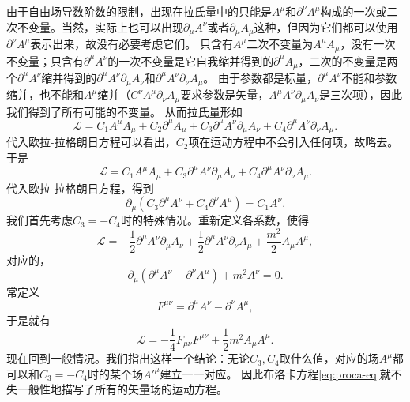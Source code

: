 由于自由场导数阶数的限制，出现在拉氏量中的只能是$A^\mu$和$\partial^\nu A^\mu$构成的一次或二次不变量。当然，实际上也可以出现$\partial_\mu A^\nu$或者$\partial_\mu A_\mu$这种，但因为它们都可以使用$\partial^\nu A^\mu$表示出来，故没有必要考虑它们。
只含有$A^\mu$二次不变量为$A^\mu A_\mu$，没有一次不变量；只含有$\partial^\mu A^\nu$的一次不变量是它自我缩并得到的$\partial^\mu A_\mu$，二次的不变量是两个$\partial^\mu A^\nu$缩并得到的$\partial^\mu A^\nu \partial_\mu A_\nu$和$\partial^\mu A^\nu \partial_\nu A_\mu$。
由于参数都是标量，$\partial^\mu A^\nu$不能和参数缩并，也不能和$A^\mu$缩并（$C^\nu A^\mu \partial_\nu A_\mu$要求参数是矢量，$A^\mu A^\nu \partial_\mu A_\nu$是三次项），因此我们得到了所有可能的不变量。
从而拉氏量形如
\[
    \mathcal{L} = C_1 A^\mu A_\mu + C_2 \partial^\mu A_\mu + C_3 \partial^\mu A^\nu \partial_\mu A_\nu + C_4 \partial^\mu A^\nu \partial_\nu A_\mu.
\]
代入欧拉-拉格朗日方程可以看出，$C_2$项在运动方程中不会引入任何项，故略去。
于是
\[
    \mathcal{L} = C_1 A^\mu A_\mu + C_3 \partial^\mu A^\nu \partial_\mu A_\nu + C_4 \partial^\mu A^\nu \partial_\nu A_\mu.
\]
代入欧拉-拉格朗日方程，得到
\begin{equation}
    \partial_\mu (C_3 \partial^\mu A^\nu +  C_4 \partial^\nu A^\mu) = C_1 A^\nu.
    \label{eq:vector-motion-eq}
\end{equation}
我们首先考虑$C_3 = - C_4$时的特殊情况。重新定义各系数，使得
\begin{equation}
    \mathcal{L} = - \frac{1}{2} \partial^\mu A^\nu \partial_\mu A_\nu + \frac{1}{2} \partial^\mu A^\nu \partial_\nu A_\mu + \frac{m^2}{2} A_\mu A^\mu,
\end{equation}
对应的，
\begin{equation}
    \partial_\mu (\partial^\mu A^\nu - \partial^\nu A^\mu) + m^2 A^\nu = 0.
    \label{eq:proca-eq}
\end{equation}
常定义
\begin{equation}
    F^{\mu \nu} = \partial^\mu A^\nu - \partial^\nu A^\mu,
\end{equation}
于是就有
\begin{equation}
    \mathcal{L} = - \frac{1}{4} F_{\mu \nu} F^{\mu \nu} + \frac{1}{2} m^2 A_\mu A^\mu.
    \label{eq:proca-lagrangian}
\end{equation}
现在回到一般情况。我们指出这样一个结论：无论$C_3,C_4$取什么值，对应的场$A^\mu$都可以和$C_3 = - C_4$时的某个场${A'}^\mu$建立一一对应。
因此布洛卡方程\eqref{eq:proca-eq}就不失一般性地描写了所有的矢量场的运动方程。

